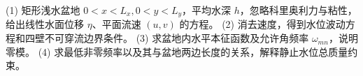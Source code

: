 (1) 矩形浅水盆地 \(0<x<L_x,0<y<L_y\)，平均水深 \(h\)，忽略科里奥利力与粘性，给出线性水面位移 \(\eta\)、平面流速 \((u,v)\) 的方程。
(2) 消去速度，得到水位波动方程和四壁不可穿流边界条件。
(3) 求盆地内水平本征函数及允许角频率 \(\omega_{mn}\)，说明零模。
(4) 求最低非零频率以及其与盆地两边长度的关系，解释静止水位总质量约束。

